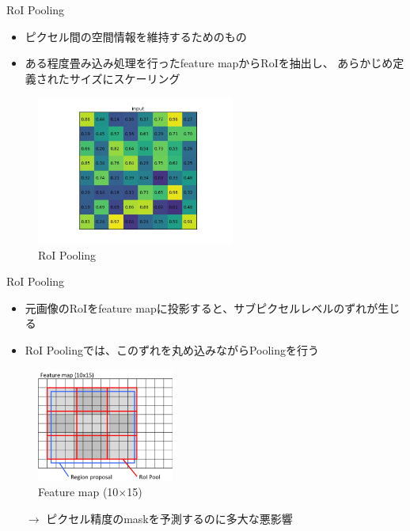 \documentclass[aspectratio=169, dvipdfmx, 11pt]{beamer}
\begin{document}
\begin{frame}{RoI Pooling}
    \begin{itemize}
        \item ピクセル間の空間情報を維持するためのもの \\
        \item ある程度畳み込み処理を行ったfeature mapからRoIを抽出し、
        あらかじめ定義されたサイズにスケーリング \\
    \end{itemize}

    \begin{figure}[htbp]
        \centering
		\includegraphics[width=6.5cm]{./figures/roi_pool.png}
        \caption{RoI Pooling}
    \end{figure}
\end{frame}

\begin{frame}{RoI Pooling}
    \begin{itemize}
        \item 元画像のRoIをfeature mapに投影すると、サブピクセルレベルのずれが生じる \\
        \item RoI Poolingでは、このずれを丸め込みながらPoolingを行う \\
    \end{itemize}

    \begin{figure}[htbp]
        \centering
		\includegraphics[width=4.5cm]{./figures/feature_map.png}
        \caption{Feature map (10$\times$15)}
    \end{figure}

    \begin{itemize}
        \item[$\rightarrow$] ピクセル精度のmaskを予測するのに多大な悪影響 \\
    \end{itemize}
\end{frame}
\end{document}
